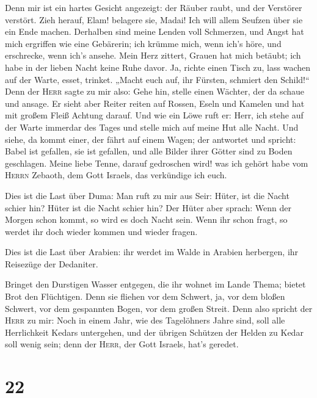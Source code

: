  Denn mir ist ein hartes Gesicht angezeigt: der Räuber
raubt, und der Verstörer verstört. Zieh herauf, Elam! belagere sie,
Madai! Ich will allem Seufzen über sie ein Ende machen. 
Derhalben sind meine Lenden voll Schmerzen, und Angst hat mich ergriffen
wie eine Gebärerin; ich krümme mich, wenn ich's höre, und erschrecke,
wenn ich's ansehe.  Mein Herz zittert, Grauen hat mich
betäubt; ich habe in der lieben Nacht keine Ruhe davor. 
Ja, richte einen Tisch zu, lass wachen auf der Warte, esset, trinket.
„Macht euch auf, ihr Fürsten, schmiert den Schild!{}`` 
Denn der \textsc{Herr} sagte zu mir also: Gehe hin, stelle einen
Wächter, der da schaue und ansage.  Er sieht aber Reiter
reiten auf Rossen, Eseln und Kamelen und hat mit großem Fleiß Achtung
darauf.  Und wie ein Löwe ruft er: Herr, ich stehe auf der
Warte immerdar des Tages und stelle mich auf meine Hut alle Nacht.
 Und siehe, da kommt einer, der fährt auf einem Wagen; der
antwortet und spricht: Babel ist gefallen, sie ist gefallen, und alle
Bilder ihrer Götter sind zu Boden geschlagen.  Meine
liebe Tenne, darauf gedroschen wird! was ich gehört habe vom
\textsc{Herrn} Zebaoth, dem Gott Israels, das verkündige ich euch.

 Dies ist die Last über Duma: Man ruft zu mir aus Seir:
Hüter, ist die Nacht schier hin? Hüter ist die Nacht schier hin?
 Der Hüter aber sprach: Wenn der Morgen schon kommt, so
wird es doch Nacht sein. Wenn ihr schon fragt, so werdet ihr doch wieder
kommen und wieder fragen.

 Dies ist die Last über Arabien: ihr werdet im Walde in
Arabien herbergen, ihr Reisezüge der Dedaniter.

 Bringet den Durstigen Wasser entgegen, die ihr wohnet im
Lande Thema; bietet Brot den Flüchtigen.  Denn sie
fliehen vor dem Schwert, ja, vor dem bloßen Schwert, vor dem gespannten
Bogen, vor dem großen Streit.  Denn also spricht der
\textsc{Herr} zu mir: Noch in einem Jahr, wie des Tagelöhners Jahre
sind, soll alle Herrlichkeit Kedars untergehen,  und der
übrigen Schützen der Helden zu Kedar soll wenig sein; denn der
\textsc{Herr}, der Gott Israels, hat's geredet.

\hypertarget{section-21}{%
\section{22}\label{section-21}}

